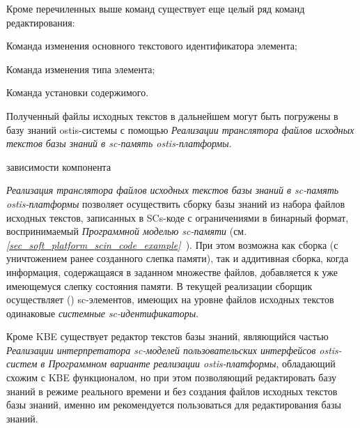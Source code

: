 Кроме перечиленных выше команд существует еще целый ряд команд редактирования:
\begin{textitemize}
\item Команда изменения основного текстового идентификатора элемента;
\item Команда изменения типа элемента;
\item Команда установки содержимого.
\end{textitemize}

Полученный файлы исходных текстов в дальнейшем могут быть погружены в базу знаний ostis-системы с помощью \textit{Реализации транслятора файлов исходных текстов базы знаний в sc-память ostis-платформы}.

\begin{SCn}

\begin{scnrelfromset}{зависимости компонента}
\end{scnrelfromset}
\end{SCn}

\textit{Реализация транслятора файлов исходных текстов базы знаний в sc-память ostis-платформы} позволяет осуществить сборку базы знаний из набора файлов исходных текстов, записанных в SCs-коде с ограничениями в бинарный формат, воспринимаемый \textit{Программной моделью sc-памяти} (см. \textit{\ref{sec_soft_platform_scin_code_example}~}).
При этом возможна как сборка  (с уничтожением ранее созданного слепка памяти), так и аддитивная сборка, когда информация, содержащаяся в заданном множестве файлов, добавляется к уже имеющемуся слепку состояния памяти.
В текущей реализации сборщик осуществляет  () sc-элементов, имеющих на уровне файлов исходных текстов одинаковые \textit{системные sc-идентификаторы}.

Кроме KBE существует редактор текстов базы знаний, являющийся частью \textit{Реализации интерпретатора sc-моделей пользовательских интерфейсов ostis-систем в Программном варианте реализации ostis-платформы}, обладающий схожим с KBE функционалом, но при этом позволяющий редактировать базу знаний в режиме реального времени и без создания файлов исходных текстов базы знаний, именно им рекомендуется пользоваться для редактирования базы знаний.

